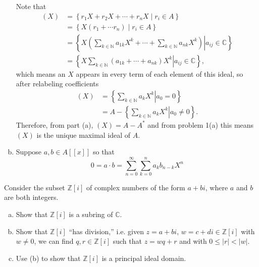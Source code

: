 \documentclass{article}
\newcounter{Problem}
\newenvironment{Problem}{\begin{Exercise}[name={Problem},
                                          counter={Problem}]}
                        {\end{Exercise}}
\begin{document}
\begin{Answer}
\begin{enumerate}[(a)]
{      Note that
      \begin{align*}
         (X)
      &= \left\{
           r_1 X + r_2 X + \cdots + r_n X
         \mid
           r_i \in A
         \right\} \\
      &= \left\{
           X (r_1 + \cdots r_n)
         \mid
           r_i \in A
         \right\} \\
      &= \left\{
           \left.
             X
             \left(
               \sum_{k \in \mathbb{N}} a_{1k} X^k
             + \cdots
             + \sum_{k \in \mathbb{N}} a_{nk} X^k
             \right)
           \right|
             a_{ij} \in \mathbb{C}
         \right\} \\
      &= \left\{
           \left.
             X
             \sum_{k \in \mathbb{N}}
               (a_{1k} + \cdots + a_{nk}) X^k
           \right|
             a_{ij} \in \mathbb{C}
         \right\},
      \end{align*}
      which means an $X$ appears in every term of each element of this
      ideal, so after relabeling coefficients
      \begin{align*}
         (X)
      &= \left\{
           \left.
             \sum_{k \in \mathbb{N}} a_k X^k
           \right|
             a_0 = 0
         \right\} \\
      &= A -
         \left\{
           \left.
             \sum_{k \in \mathbb{N}} a_k X^k
           \right|
             a_0 \neq 0
         \right\}.
      \end{align*}
      Therefore, from part (a), $(X) = A - A^\ast$
      and from problem 1(a) this means $(X)$ is the unique maximal
      ideal of $A$.
    }
    \item{
      Suppose $a, b \in A[[x]]$ so that
      $$
      0 = a \cdot b = \sum_{n=0}^\infty \sum_{k=0}^n a_k b_{n-k} X^n
      $$
    }
  \end{enumerate}
\end{Answer}

\pagebreak

\begin{Problem}
  Consider the subset $\mathbb{Z}[i]$ of complex numbers of the form
  $a + bi$, where $a$ and $b$ are both integers.
  \begin{enumerate}[(a)]
    \item{
      Show that $\mathbb{Z}[i]$ is a subring of $\mathbb{C}$.
    }
    \item{
      Show that $\mathbb{Z}[i]$ ``has division,'' i.e. given
      $z = a + bi$, $w = c + di \in \mathbb{Z}[i]$ with $w \neq 0$, we
      can find $q, r \in \mathbb{Z}[i]$ such that $z = wq + r$ and
      with $0 \leq |r| < |w|$.
    }
    \item{
      Use (b) to show that $\mathbb{Z}[i]$ is a principal ideal domain.
    }
  \end{enumerate}
\end{Problem}
\end{document}
